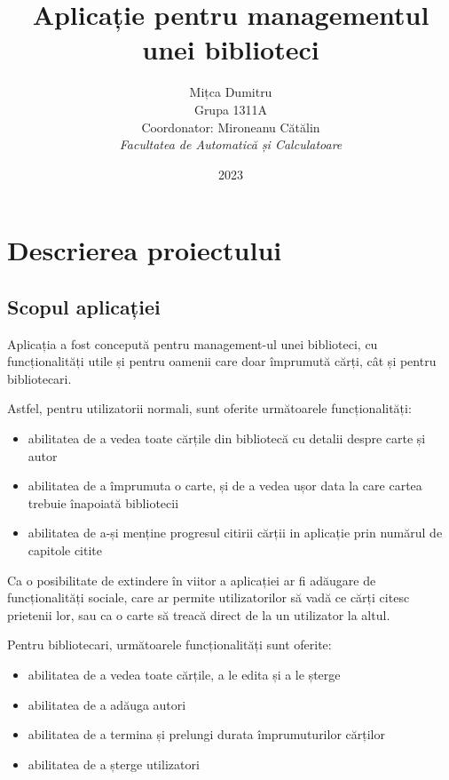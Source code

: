 \documentclass{article}
\title{Aplicație pentru managementul unei biblioteci}
\author{
    Mițca Dumitru\\
    Grupa 1311A\\
    Coordonator: Mironeanu Cătălin\\
    \emph{Facultatea de Automatică și Calculatoare}
}
\date{2023}
\begin{document}
    \maketitle
    \hypersetup{linkbordercolor=1 1 1}
    \renewcommand*\contentsname{Cuprins}
    \tableofcontents
    \hypersetup{linkbordercolor=1 0 0}

    \newpage

    \section{Descrierea proiectului}

    \subsection{Scopul aplicației}

    Aplicația a fost concepută pentru management-ul unei biblioteci, cu funcționalități utile și pentru
    oamenii care doar împrumută cărți, cât și pentru bibliotecari.

    Astfel, pentru utilizatorii normali, sunt oferite următoarele funcționalități:
    \begin{itemize}
        \item abilitatea de a vedea toate cărțile din bibliotecă cu detalii despre carte și autor
        \item abilitatea de a împrumuta o carte, și de a vedea ușor data la care cartea trebuie înapoiată bibliotecii
        \item abilitatea de a-și menține progresul citirii cărții in aplicație prin numărul de capitole citite
    \end{itemize}
    Ca o posibilitate de extindere în viitor a aplicației ar fi adăugare de funcționalități sociale, care ar permite
    utilizatorilor să vadă ce cărți citesc prietenii lor, sau ca o carte să treacă direct de la un utilizator
    la altul.

    Pentru bibliotecari, următoarele funcționalități sunt oferite:
    \begin{itemize}
        \item abilitatea de a vedea toate cărțile, a le edita și a le șterge
        \item abilitatea de a adăuga autori
        \item abilitatea de a termina și prelungi durata împrumuturilor cărților
        \item abilitatea de a șterge utilizatori
    \end{itemize}
\end{document}
